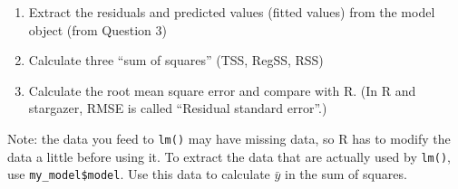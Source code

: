 \documentclass{article}\usepackage[]{graphicx}\usepackage[]{color}
\begin{document}
\begin{enumerate}
\item Extract the residuals and predicted values (fitted values) from the model object (from Question 3)
\item Calculate three ``sum of squares'' (TSS, RegSS, RSS)
\item Calculate the root mean square error and compare with R. (In R and stargazer, RMSE is called ``Residual standard error''.)
\end{enumerate}

Note: the data you feed to \verb`lm()` may have missing data, so R has to modify the data a little before using it. To extract the data that are actually used by \verb`lm()`, use \verb`my_model$model`. Use this data to calculate $\bar y$ in the sum of squares.
\end{document}
